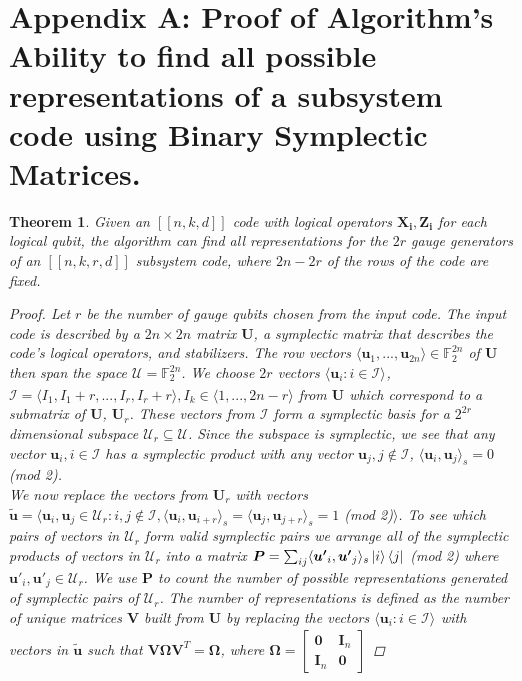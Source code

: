 \documentclass[conference]{IEEEtran}
\newtheorem{theorem}{Theorem}
\begin{document}
 \section*{Appendix A: Proof of Algorithm's Ability to find all possible representations of a subsystem code using Binary Symplectic Matrices. }
\begin{theorem} Given an $\left[[n,k,d]\right]$ code with logical operators $\boldsymbol{X_{i}},\boldsymbol{Z_{i}}$  for each logical qubit, the algorithm can find all representations for the $2r$ gauge generators of an $\left[[n,k,r,d]\right]$ subsystem code, where $2n-2r$ of the rows of the code are fixed.

\begin{proof}
Let $r$ be the number of gauge qubits chosen from the input code. The input code is described by a $2n \times 2n$ matrix $\boldsymbol{U}$, a symplectic matrix that describes the code's logical operators, and stabilizers. The row vectors $\langle\boldsymbol{u}_{1},...,\boldsymbol{u}_{2n}\rangle \in \mathbb{F}^{2n}_{2}$ of $\boldsymbol{U}$ then span the space $\mathcal{U}	= \mathbb{F}^{2n}_{2}$. We choose $2r$ vectors $\langle \boldsymbol{u}_i : i\in \mathcal{I}\rangle_{}$,  $\mathcal{I}=\langle I_{1},I_{1}+r,...,I_{r},I_{r}+r\rangle, I_{k}\in \langle 1,...,2n-r \rangle$ from $\boldsymbol{U}$ which correspond to a submatrix of  $\boldsymbol{U}$,  $\boldsymbol{U}_r$. These vectors from $\mathcal{I}$ form a symplectic basis for a $2^{2r}$ dimensional subspace $\mathcal{U}_{r} \subseteq \mathcal{U}$.
Since the subspace is symplectic, we see that any vector $\boldsymbol{u}_{i}, i\in \mathcal{I}$ has a symplectic product with any vector $\boldsymbol{u}_{j}, j\notin \mathcal{I}$,  $\langle \boldsymbol{u}_{i},\boldsymbol{u}_{j}\rangle_{s}=0 $ (mod 2). \\ We now replace the vectors from  $\boldsymbol{U}_r$ with vectors  $\tilde{\boldsymbol{u}}=\langle \boldsymbol{u}_{i},\boldsymbol{u}_{j} \in \mathcal{U}_r : i,j \notin \mathcal{I}, \langle\boldsymbol{u}_{i},\boldsymbol{u}_{i+r}\rangle_{s}=\langle\boldsymbol{u}_{j},\boldsymbol{u}_{j+r}\rangle_{s} =1$ (mod 2)$\rangle$. To see which pairs of vectors in $\mathcal{U}_r$ form valid symplectic pairs we arrange all of the symplectic products of vectors in $\mathcal{U}_r$ into a matrix $\boldsymbol{P}=\sum_{ij} \langle \boldsymbol{u'}_{i},\boldsymbol{u'}_{j}\rangle_{s}\ket{i}\bra{j} $ (mod 2) where $\boldsymbol{u'}_{i},\boldsymbol{u'}_{j} \in \mathcal{U}_r$. 
We use $\boldsymbol{P}$ to count the number of possible representations generated of symplectic pairs of $\mathcal{U}_{r}$. The number of representations is defined as the number of unique matrices $\boldsymbol{V}$ built from $\boldsymbol{U}$ by replacing the vectors $\langle \boldsymbol{u}_i : i\in \mathcal{I}\rangle_{}$ with  vectors in $\tilde{\boldsymbol{u}}$  such that $\boldsymbol{V}\boldsymbol{\Omega}\boldsymbol{V}^T=\boldsymbol{\Omega}$, where $\boldsymbol{\Omega}=\begin{bmatrix} 
  \boldsymbol{0} & \boldsymbol{I}_n \\
  \boldsymbol{I}_n & \boldsymbol{0}
  \end{bmatrix}$
  

\end{proof}
\end{theorem}
\end{document}
